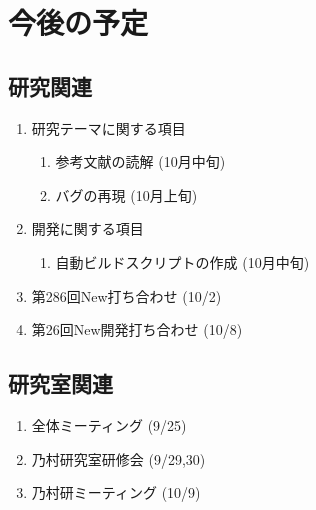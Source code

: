 \documentclass[fleqn, 14pt]{extarticle}
\begin{document}
    \section{今後の予定}
    \label{sec-4}

    \subsection{研究関連}
    \label{sec-4-1}

    \begin{enumerate}

        \item 研究テーマに関する項目
            \hfill
            \begin{enumerate}

                \item 参考文献の読解
                    \hfill
                    (10月中旬)

                \item バグの再現
                    \hfill
                    (10月上旬)

            \end{enumerate}

        \item 開発に関する項目
            \hfill
            \begin{enumerate}

                \item 自動ビルドスクリプトの作成
                    \hfill
                    (10月中旬)

            \end{enumerate}

        \item 第286回New打ち合わせ
            \hfill
            \label{enum-7}
            (10/2)

        \item 第26回New開発打ち合わせ
            \hfill
            \label{enum-7}
            (10/8)

    \end{enumerate}

    \subsection{研究室関連}
    \label{sec-4-2}

    \begin{enumerate}

        \item 全体ミーティング
            \hfill
            \label{enum-18}
            (9/25)

        \item 乃村研究室研修会
            \hfill
            \label{enum-18}
            (9/29,30)

        \item 乃村研ミーティング
            \hfill
            \label{enum-18}
            (10/9)

    \end{enumerate}
\end{document}
